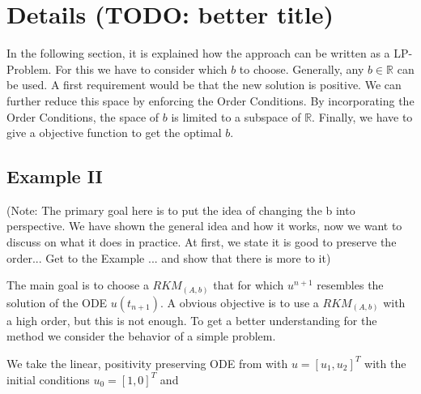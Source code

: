 \documentclass{article}
\begin{document}
\section{Details (TODO: better title)}\label{sec:LP-Problem}

In the following section, it is explained how the approach can be written as a LP-Problem. 
For this we have to consider which $b$ to choose. 
Generally, any $b \in \mathbb{R}$ can be used. 
A first requirement would be that the new solution is positive.
We can further reduce this space by enforcing the Order Conditions. 
By incorporating the Order Conditions, the space of $b$ is limited to a subspace of $\mathbb{R}$. %
Finally, we have to give a objective function to get the optimal $b$.


\subsection{Example II}\label{sec:example_lin}

(Note: The primary goal here is to put the idea of changing the b into perspective. We have shown the general idea and how it works, now we want to discuss on what it does in practice. At first, we state it is good to preserve the order... Get to the Example ... and show that there is more to it)


The main goal is to choose a $RKM_{(A,b)}$ that for which $u^{n+1}$ resembles the solution of the ODE $u(t_{n+1})$. 
A obvious objective is to use a $RKM_{(A,b)}$ with a high order, but this is not enough.
To get a better understanding for the method we consider the behavior of a simple problem.   

We take the linear, positivity preserving ODE from \cite{kopecz_unconditionally_2018} with $u = [u_1,u_2]^T$ with the initial conditions $u_0 = [1,0]^T$ and
\end{document}
